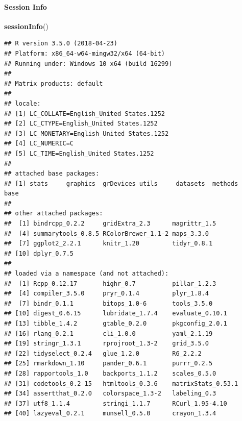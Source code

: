 \documentclass[]{article}
\newenvironment{Shaded}{\begin{snugshade}}{\end{snugshade}}
\newcommand{\KeywordTok}[1]{\textcolor[rgb]{0.13,0.29,0.53}{\textbf{#1}}}
\newcommand{\NormalTok}[1]{#1}
\let\oldparagraph\paragraph
\renewcommand{\paragraph}[1]{\oldparagraph{#1}\mbox{}}
\begin{document}
\paragraph{Session Info}\label{session-info}

\begin{Shaded}
\begin{Highlighting}[]
\KeywordTok{sessionInfo}\NormalTok{()}
\end{Highlighting}
\end{Shaded}

\begin{verbatim}
## R version 3.5.0 (2018-04-23)
## Platform: x86_64-w64-mingw32/x64 (64-bit)
## Running under: Windows 10 x64 (build 16299)
## 
## Matrix products: default
## 
## locale:
## [1] LC_COLLATE=English_United States.1252 
## [2] LC_CTYPE=English_United States.1252   
## [3] LC_MONETARY=English_United States.1252
## [4] LC_NUMERIC=C                          
## [5] LC_TIME=English_United States.1252    
## 
## attached base packages:
## [1] stats     graphics  grDevices utils     datasets  methods   base     
## 
## other attached packages:
##  [1] bindrcpp_0.2.2     gridExtra_2.3      magrittr_1.5      
##  [4] summarytools_0.8.5 RColorBrewer_1.1-2 maps_3.3.0        
##  [7] ggplot2_2.2.1      knitr_1.20         tidyr_0.8.1       
## [10] dplyr_0.7.5       
## 
## loaded via a namespace (and not attached):
##  [1] Rcpp_0.12.17       highr_0.7          pillar_1.2.3      
##  [4] compiler_3.5.0     pryr_0.1.4         plyr_1.8.4        
##  [7] bindr_0.1.1        bitops_1.0-6       tools_3.5.0       
## [10] digest_0.6.15      lubridate_1.7.4    evaluate_0.10.1   
## [13] tibble_1.4.2       gtable_0.2.0       pkgconfig_2.0.1   
## [16] rlang_0.2.1        cli_1.0.0          yaml_2.1.19       
## [19] stringr_1.3.1      rprojroot_1.3-2    grid_3.5.0        
## [22] tidyselect_0.2.4   glue_1.2.0         R6_2.2.2          
## [25] rmarkdown_1.10     pander_0.6.1       purrr_0.2.5       
## [28] rapportools_1.0    backports_1.1.2    scales_0.5.0      
## [31] codetools_0.2-15   htmltools_0.3.6    matrixStats_0.53.1
## [34] assertthat_0.2.0   colorspace_1.3-2   labeling_0.3      
## [37] utf8_1.1.4         stringi_1.1.7      RCurl_1.95-4.10   
## [40] lazyeval_0.2.1     munsell_0.5.0      crayon_1.3.4
\end{verbatim}
\end{document}
